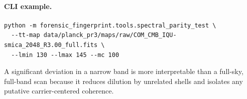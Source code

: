 \documentclass[11pt]{article}
\begin{document}
\paragraph{CLI example.}
\begin{verbatim}
python -m forensic_fingerprint.tools.spectral_parity_test \
  --tt-map data/planck_pr3/maps/raw/COM_CMB_IQU-smica_2048_R3.00_full.fits \
  --lmin 130 --lmax 145 --mc 100
\end{verbatim}

A significant deviation in a narrow band is more interpretable than a full-sky, full-band scan because it reduces dilution by unrelated shells and isolates any putative carrier-centered coherence.
\end{document}
